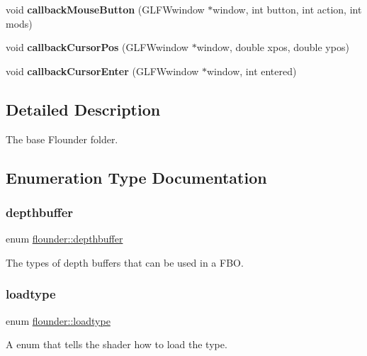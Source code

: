 \begin{DoxyCompactItemize}
\item 
\mbox{\label{namespaceflounder_a3914861bc871e4d237b5878fde9bcbbd}} 
void {\bfseries callback\+Mouse\+Button} (G\+L\+F\+Wwindow $\ast$window, int button, int action, int mods)
\item 
\mbox{\label{namespaceflounder_a84f436b17b1e87b7e8ff691b9ab0bb09}} 
void {\bfseries callback\+Cursor\+Pos} (G\+L\+F\+Wwindow $\ast$window, double xpos, double ypos)
\item 
\mbox{\label{namespaceflounder_ab637dcebaebff142804649b9136870d8}} 
void {\bfseries callback\+Cursor\+Enter} (G\+L\+F\+Wwindow $\ast$window, int entered)
\end{DoxyCompactItemize}


\subsection{Detailed Description}
The base Flounder folder. 



\subsection{Enumeration Type Documentation}
\mbox{\label{namespaceflounder_aed09c736167e783c910ec9e58479b57c}} 
\subsubsection{\texorpdfstring{depthbuffer}{depthbuffer}}
{\footnotesize\ttfamily enum \hyperlink{namespaceflounder_aed09c736167e783c910ec9e58479b57c}{flounder\+::depthbuffer}}



The types of depth buffers that can be used in a F\+BO. 

\mbox{\label{namespaceflounder_a69b4e6ffcd64f6175546ca0942d18565}} 
\subsubsection{\texorpdfstring{loadtype}{loadtype}}
{\footnotesize\ttfamily enum \hyperlink{namespaceflounder_a69b4e6ffcd64f6175546ca0942d18565}{flounder\+::loadtype}}



A enum that tells the shader how to load the type. 

